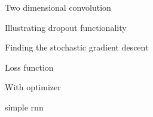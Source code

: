 \begin{figure}
	\centering
    
    \caption{Two dimensional convolution}
    \label{fig:2dconv}
\end{figure}

\begin{figure}
	\centering
    \begin{Large}
    

    \end{Large}
    \caption{Illustrating dropout functionality}
    \label{fig:Dropout_function}
\end{figure}

\begin{figure}
	\centering
    \begin{Large}
        

    \end{Large}
    \caption{Finding the stochastic gradient descent}
    \label{fig:gradientdescent}
\end{figure}

\begin{figure}
	\centering
        \def\svgwidth{0.8\textwidth}

        

    \caption{Loss function}
    \label{fig:loss function}
\end{figure}

\begin{figure}
	\centering
        \def\svgwidth{0.81\textwidth}

        

    \caption{With optimizer}
    \label{fig:withoptimizer}
\end{figure}


\begin{figure}
	\centering
        \def\svgwidth{0.8\textwidth}
\begin{tiny}
        

\end{tiny}

    \caption{simple rnn}
    \label{fig:rnn}
\end{figure}


